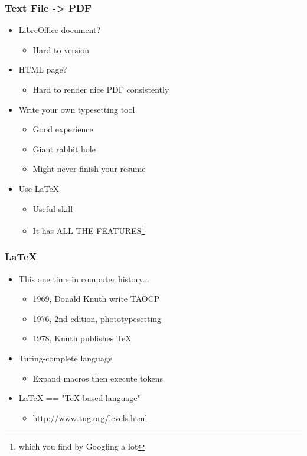 \documentclass{beamer}
\begin{document}
\begin{frame}
 \frametitle{Text File -> PDF}



\begin{itemize}
  \item LibreOffice document?
\begin{itemize}
  \item Hard to version
\end{itemize}
  \item HTML page?
\begin{itemize}
  \item Hard to render nice PDF consistently
\end{itemize}
  \item Write your own typesetting tool
\begin{itemize}
  \item Good experience
  \item Giant rabbit hole
  \item Might never finish your resume
\end{itemize}
  \item Use LaTeX
\begin{itemize}
  \item Useful skill
  \item It has ALL THE FEATURES\footnote{which you find by Googling a lot}
\end{itemize}
\end{itemize}


\end{frame}
\begin{frame}
 \frametitle{LaTeX}



\begin{itemize}
  \item This one time in computer history...
\begin{itemize}
  \item 1969, Donald Knuth write TAOCP
  \item 1976, 2nd edition, phototypesetting
  \item 1978, Knuth publishes TeX
\end{itemize}
  \item Turing-complete language
\begin{itemize}
  \item Expand macros then execute tokens
\end{itemize}
  \item LaTeX == "TeX-based language"
\begin{itemize}
  \item http://www.tug.org/levels.html
\end{itemize}
\end{itemize}


\end{frame}
\end{document}
